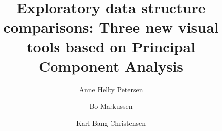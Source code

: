 \documentclass[a4paper,14pt]{article}
\begin{document}

\title{Exploratory data structure comparisons: Three new visual tools based on Principal Component Analysis}

\author[1]{Anne Helby Petersen}
\author[1]{Bo Markussen}
\author[3]{Karl Bang Christensen}

\maketitle
\end{document}
